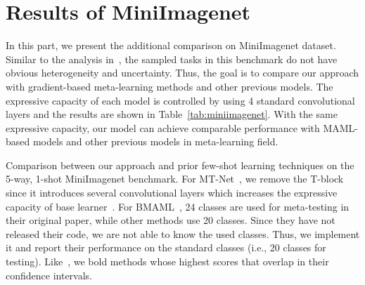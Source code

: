 \documentclass{article}
\begin{document}
\section{Results of MiniImagenet}
\label{app:miniimagenet}
In this part, we present the additional comparison on MiniImagenet dataset. Similar to the analysis in~\cite{finn2018probabilistic}, the sampled tasks in this benchmark do not have obvious heterogeneity and uncertainty. Thus, the goal is to compare our approach with gradient-based meta-learning methods and other previous models. The expressive capacity of each model is controlled by using 4 standard convolutional layers and the results are shown in Table~\ref{tab:miniimagenet}. With the same expressive capacity, our model can achieve comparable performance with MAML-based models and other previous models in meta-learning field. 
\begin{table}[h]
\caption{Comparison between our approach and prior
few-shot learning techniques on the 5-way, 1-shot MiniImagenet benchmark. For MT-Net~\cite{lee2018gradient}, we remove the T-block since it introduces several  convolutional layers which increases the expressive capacity of base learner~\cite{lin2013network}. For BMAML~\cite{yoon2018bayesian}, 24 classes are used for meta-testing in their original paper, while other methods use 20 classes. Since they have not released their code, we are not able to know the used classes. Thus, we implement it and report their performance on the standard classes (i.e., 20 classes for testing). Like~\cite{finn2018probabilistic}, we bold methods whose highest scores that overlap in their confidence intervals.}


\end{table}
\end{document}
